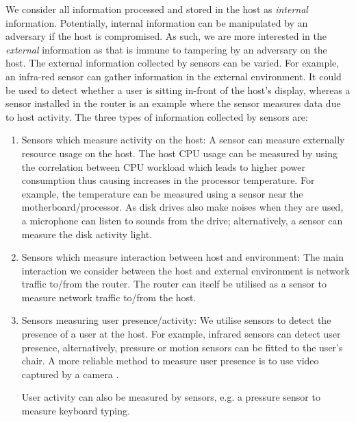 We consider all information processed and stored in the host as {\em
internal} information.
Potentially, internal information
can be manipulated by an adversary if the host is
compromised.
As such, we are more interested in the {\em external} information
as that is immune to tampering by an adversary on the host.
The external information collected by sensors can be varied.
For example, an infra-red sensor can gather information in the
external environment. It could be used to detect whether
a user is sitting in-front of the host's display,
whereas a sensor installed in the router is an example where the sensor
measures data due to host activity.
The three types of information collected by sensors are:
\begin{enumerate}
\item Sensors which measure activity on the host:
A sensor can measure externally resource usage on the host.
The host CPU usage can be measured by using the correlation between
CPU workload which leads to higher power consumption thus causing
increases in the processor temperature.
For example, the temperature can be
measured using a sensor near the motherboard/processor.
As disk drives also make noises when they are used,
a microphone can listen to sounds from the drive; alternatively,
a sensor can measure the disk activity light.

\item Sensors which measure interaction between host and environment:
The main interaction we consider between the host and external environment
is network traffic to/from the router.
The router can itself be utilised as a sensor to measure network traffic
to/from the host.

\item Sensors measuring user presence/activity:
We utilise sensors to detect the presence of a user at the host.
For example, infrared sensors can detect user presence,
alternatively, pressure or motion sensors can be fitted to the user's chair.
A more reliable method to measure user presence is to use
video captured by a camera \cite{kumar2005using,kwang2009usability}.

User activity can also be measured by sensors, e.g.
a pressure sensor to measure keyboard typing.
\end{enumerate}

